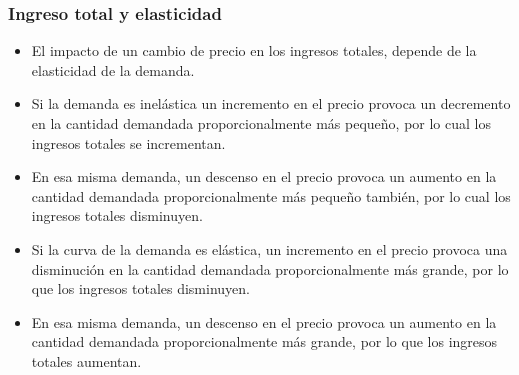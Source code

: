 \documentclass{beamer}
\begin{document}
\begin{frame}
\frametitle{Ingreso total y elasticidad}
\begin{itemize}
    \item El impacto de un cambio de precio en los ingresos totales, depende de la elasticidad de la demanda.
    \item Si la demanda es inelástica un incremento en el precio provoca un decremento en la cantidad demandada proporcionalmente más pequeño, por lo cual los ingresos totales se incrementan.
    \item En esa misma demanda, un descenso en el precio provoca un aumento en la cantidad demandada proporcionalmente más pequeño también, por lo cual los ingresos totales disminuyen.
    \item Si la curva de la demanda es elástica, un incremento en el precio provoca una disminución en la cantidad demandada proporcionalmente más grande, por lo que los ingresos totales disminuyen.
    \item En esa misma demanda, un descenso en el precio provoca un aumento en la cantidad demandada proporcionalmente más grande, por lo que los ingresos totales aumentan.
\end{itemize}
\end{frame}
\end{document}

